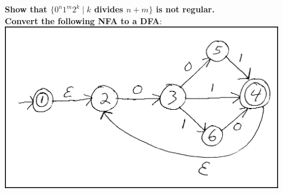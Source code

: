 \documentclass{article}
\begin{document}
    \textbf{Show that $\{0^n1^m2^k\mid k$ divides $n+m\}$ is not regular.}\\
    \textbf{Convert the following NFA to a DFA}:\\
    \includegraphics[scale=0.75]{machine}
\end{document}
